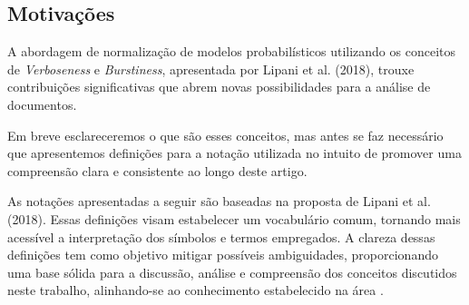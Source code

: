 \documentclass[runningheads]{llncs}
\begin{document}
\subsection{Motivações}
A abordagem de normalização de modelos probabilísticos utilizando os conceitos de \textit{Verboseness} e \textit{Burstiness}, apresentada por Lipani et al. (2018), trouxe contribuições significativas que abrem novas possibilidades para a análise de documentos.

Em breve esclareceremos o que são esses conceitos, mas antes se faz necessário que apresentemos definições para a notação utilizada no intuito de promover uma compreensão clara e consistente ao longo deste artigo.

As notações apresentadas a seguir são baseadas na proposta de Lipani et al. (2018). Essas definições visam estabelecer um vocabulário comum, tornando mais acessível a interpretação dos símbolos e termos empregados. A clareza dessas definições tem como objetivo mitigar possíveis ambiguidades, proporcionando uma base sólida para a discussão, análise e compreensão dos conceitos discutidos neste trabalho, alinhando-se ao conhecimento estabelecido na área \cite{Lipani2018}.
\end{document}
